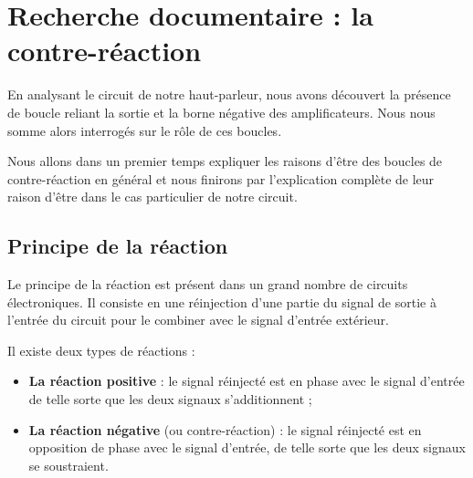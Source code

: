 

\section{Recherche documentaire : la contre-réaction}
En analysant le circuit de notre haut-parleur, nous avons découvert la présence de boucle reliant la sortie et la borne négative des amplificateurs. Nous nous somme alors interrogés sur le rôle de ces boucles.

Nous allons dans un premier temps expliquer les raisons d'être des boucles de contre-réaction en général et nous finirons par l'explication complète de leur raison d'être dans le cas particulier de notre circuit.



\subsection{Principe de la réaction}
Le principe de la réaction est présent dans un grand nombre de circuits électroniques. Il consiste en une réinjection d'une partie du signal de sortie à l'entrée du circuit pour le combiner avec le signal d'entrée extérieur.

Il existe deux types de réactions :

\begin{itemize}
	\item \textbf{La réaction positive} : le signal réinjecté est en phase avec le signal d'entrée de telle sorte que les deux signaux s'additionnent ;
	\item \textbf{La réaction négative} (ou contre-réaction) : le signal réinjecté est en opposition de phase avec le signal d'entrée, de telle sorte que les deux signaux
	se soustraient.
\end{itemize}

